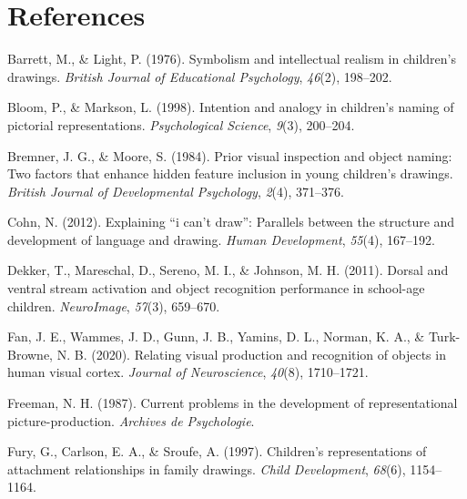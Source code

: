 \documentclass[
  english,
  man]{apa6}
\begin{document}
\newpage

\hypertarget{references}{%
\section{References}\label{references}}

\begingroup
\setlength{\parindent}{-0.5in}
\setlength{\leftskip}{0.5in}

\hypertarget{refs}{}
\leavevmode\hypertarget{ref-barrett1976symbolism}{}%
Barrett, M., \& Light, P. (1976). Symbolism and intellectual realism in children's drawings. \emph{British Journal of Educational Psychology}, \emph{46}(2), 198--202.

\leavevmode\hypertarget{ref-bloom1998intention}{}%
Bloom, P., \& Markson, L. (1998). Intention and analogy in children's naming of pictorial representations. \emph{Psychological Science}, \emph{9}(3), 200--204.

\leavevmode\hypertarget{ref-bremmer1984prior}{}%
Bremner, J. G., \& Moore, S. (1984). Prior visual inspection and object naming: Two factors that enhance hidden feature inclusion in young children's drawings. \emph{British Journal of Developmental Psychology}, \emph{2}(4), 371--376.

\leavevmode\hypertarget{ref-cohn2012explaining}{}%
Cohn, N. (2012). Explaining ``i can't draw'': Parallels between the structure and development of language and drawing. \emph{Human Development}, \emph{55}(4), 167--192.

\leavevmode\hypertarget{ref-dekker2011dorsal}{}%
Dekker, T., Mareschal, D., Sereno, M. I., \& Johnson, M. H. (2011). Dorsal and ventral stream activation and object recognition performance in school-age children. \emph{NeuroImage}, \emph{57}(3), 659--670.

\leavevmode\hypertarget{ref-fan2020relating}{}%
Fan, J. E., Wammes, J. D., Gunn, J. B., Yamins, D. L., Norman, K. A., \& Turk-Browne, N. B. (2020). Relating visual production and recognition of objects in human visual cortex. \emph{Journal of Neuroscience}, \emph{40}(8), 1710--1721.

\leavevmode\hypertarget{ref-freeman1987current}{}%
Freeman, N. H. (1987). Current problems in the development of representational picture-production. \emph{Archives de Psychologie}.

\leavevmode\hypertarget{ref-fury1997children}{}%
Fury, G., Carlson, E. A., \& Sroufe, A. (1997). Children's representations of attachment relationships in family drawings. \emph{Child Development}, \emph{68}(6), 1154--1164.
\end{document}
